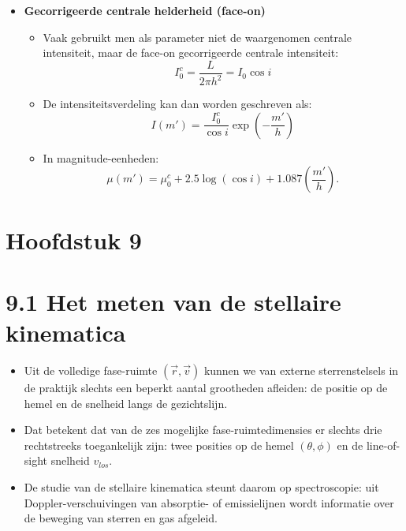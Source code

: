 \documentclass[10pt,a4paper]{article}
\renewenvironment{equation}{\begin{equation*}}{\end{equation*}}
\begin{document}
\begin{itemize}
  \item \textbf{Gecorrigeerde centrale helderheid (face-on)}
  \begin{itemize}
    \item Vaak gebruikt men als parameter niet de waargenomen centrale intensiteit, maar de face-on gecorrigeerde centrale intensiteit:
    \begin{equation}
      I_0^c=\frac{L}{2\pi h^2}=I_0\cos i
      \tag{2.68}
    \end{equation}
    \item De intensiteitsverdeling kan dan worden geschreven als:
    \begin{equation}
      I(m')=\frac{I_0^c}{\cos i}\exp\!\left(-\frac{m'}{h}\right)
      \tag{2.69}
    \end{equation}
    \item In magnitude-eenheden:
    \begin{equation}
      \mu(m')=\mu_0^c + 2.5\log(\cos i) + 1.087\left(\frac{m'}{h}\right).
      \tag{2.70}
    \end{equation}
  \end{itemize}
\end{itemize}

\section*{Hoofdstuk 9}
\section*{9.1 Het meten van de stellaire kinematica}
\begin{itemize}
  \item Uit de volledige fase-ruimte $(\vec{r},\vec{v})$ kunnen we van externe sterrenstelsels in de praktijk slechts een beperkt aantal grootheden afleiden: de positie op de hemel en de snelheid langs de gezichtslijn.
  \item Dat betekent dat van de zes mogelijke fase-ruimtedimensies er slechts drie rechtstreeks toegankelijk zijn: twee posities op de hemel $(\theta,\phi)$ en de line-of-sight snelheid $v_{los}$.
  \item De studie van de stellaire kinematica steunt daarom op spectroscopie: uit Doppler-verschuivingen van absorptie- of emissielijnen wordt informatie over de beweging van sterren en gas afgeleid.
\end{itemize}
\end{document}

